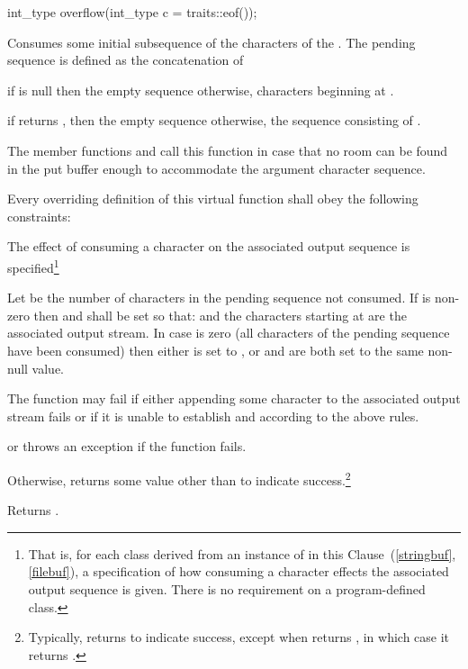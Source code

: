 %
\begin{itemdecl}
int_type overflow(int_type c = traits::eof());
\end{itemdecl}

\begin{itemdescr}
\pnum
\effects
Consumes some initial subsequence of the characters of the
.
The pending sequence is defined as the concatenation of
\begin{enumeratea}
\item
if
is null then the empty sequence otherwise,
characters beginning at
.
\item
if
returns
,
then the empty sequence
otherwise, the sequence consisting of .
\end{enumeratea}

\pnum
\remarks
The member functions
and
call this function in case that
no room can be found in the put buffer enough to accommodate the
argument character sequence.

\pnum
\requires
Every overriding definition of this virtual function
shall obey the following constraints:
\begin{enumeraten}
\item
The effect of consuming a character on the associated output sequence is
specified\footnote{That is, for each class derived from an instance of
in this Clause~(\ref{stringbuf},
\ref{filebuf}),
a specification of how consuming a character effects the associated output sequence is given.
There is no requirement on a program-defined class.}
\item
Let
be the number of characters in the pending sequence not consumed.
If
is non-zero then
and
shall be set so that:
and the  characters starting at
are the associated output stream.
In case   is zero (all characters of the pending sequence have been consumed)
then either
is set to
,
or
and
are both set to the same non-null value.
\item
The function may fail if either
appending some character to the associated output stream fails or
if it is unable to establish
and
according to the above rules.
\end{enumeraten}

\pnum
\returns
{}
or throws an exception
if the function fails.

Otherwise,
returns some value other than
to indicate success.\footnote{Typically,
returns  to indicate success, except when
returns
,
in which case it returns
.}

\pnum
{}
Returns
.
\end{itemdescr}

